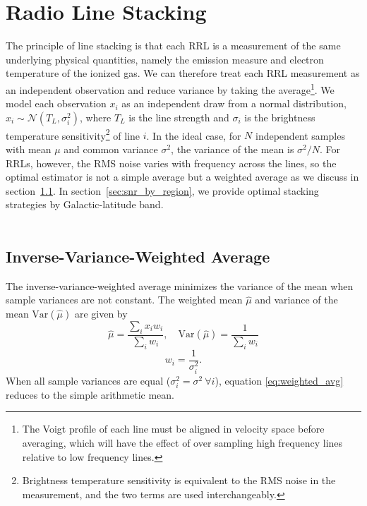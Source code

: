\chapter{Radio Line Stacking}
\label{sec:line_stacking}
The principle of line stacking is that each RRL is a measurement of the same underlying physical quantities, namely the emission measure and electron temperature of the ionized gas. We can therefore treat each RRL measurement as an independent observation and reduce variance by taking the average\footnote{The Voigt profile of each line must be aligned in velocity space before averaging, which will have the effect of over sampling high frequency lines relative to low frequency lines.}. We model each observation \(x_i\) as an independent draw from a normal distribution, \(x_i \sim \mathcal{N}(T_L, \sigma_i^2)\), where \(T_L\) is the line strength and \(\sigma_i\) is the brightness temperature sensitivity\footnote{Brightness temperature sensitivity is equivalent to the RMS noise in the measurement, and the two terms are used interchangeably.} of line \(i\). In the ideal case, for \(N\) independent samples with mean \(\mu\) and common variance \(\sigma^2\), the variance of the mean is \(\sigma^2/N\). For RRLs, however, the RMS noise varies with frequency across the lines, so the optimal estimator is not a simple average but a weighted average as we discuss in section~\ref{sec:weighted_average}. In section~\ref{sec:snr_by_region}, we provide optimal stacking strategies by Galactic-latitude band. \\
\\
\section{Inverse-Variance-Weighted Average}
\label{sec:weighted_average}
The inverse-variance-weighted average minimizes the variance of the mean when sample variances are not constant. The weighted mean \(\hat{\mu}\) and variance of the mean \(\mathrm{Var}(\hat{\mu})\) are given by
\begin{equation}
    \hat{\mu} = \frac{\sum_i x_i w_i}{\sum_i w_i}, \quad \mathrm{Var}(\hat{\mu}) = \frac{1}{\sum_i w_i}
    \label{eq:weighted_avg}
\end{equation}
\begin{equation}
    w_i = \frac{1}{\sigma_i^2}.
\end{equation}
When all sample variances are equal (\(\sigma_i^2 = \sigma^2\ \forall i\)), equation \eqref{eq:weighted_avg} reduces to the simple arithmetic mean.

